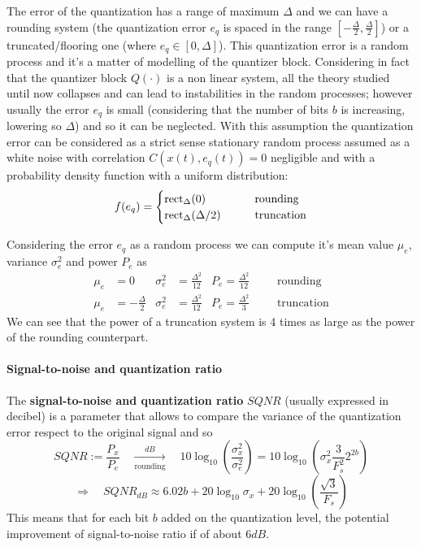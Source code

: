 	The error of the quantization has a range of maximum $\Delta$ and we can have a rounding system (the quantization error $e_q$ is spaced in the range $[-\frac \Delta 2, \frac \Delta 2]$) or a truncated/flooring one (where $e_q \in [0,\Delta]$). This quantization error is a random process and it's a matter of modelling of the quantizer block. Considering in fact that the quantizer block $Q(\cdot)$ is a non linear system, all the theory studied until now collapses and can lead to instabilities in the random processes; however usually the error $e_q$ is small (considering that the number of bits $b$ is increasing, lowering so $\Delta$) and so it can be neglected. With this assumption the quantization error can be considered as a strict sense stationary random process assumed as a white noise with correlation $C(x(t),e_q(t)) = 0$ negligible and with a probability density function with a uniform distribution:
	\[ f(e_q) = \begin{cases}
		\textrm{rect}_{\Delta}(0) \qquad &\textrm{rounding} \\
		\textrm{rect}_{\Delta}(\Delta/2) \qquad &\textrm{truncation} 
	\end{cases} \]
	
	Considering the error $e_q$ as a  random process we can compute it's mean value $\mu_e$, variance $\sigma_e^2$ and power $P_e$ as
	\begin{align*}
		\mu_e &= 0 &\sigma_e^2 &= \frac{\Delta^2}{12} & P_e =  \frac{\Delta^2}{12} &  &&\textrm{rounding} \\
		\mu_e &= -\frac{\Delta}{2} & \sigma_e^2 &= \frac{\Delta^2}{12} & P_e =  \frac{\Delta^2}{3} &  &&\textrm{truncation} 
	\end{align*}
	We can see that the power of a truncation system is 4 times as large as the power of the rounding counterpart.
	
	\paragraph{Signal-to-noise and quantization ratio} The \textbf{signal-to-noise and quantization ratio} $SQNR$ (usually expressed in decibel) is a parameter that allows to compare the variance of the quantization error respect to the original signal and so
	\[ SQNR := \frac{P_x}{P_e}  \quad \xrightarrow[\textrm{rounding}]{dB} \quad 10 \log_{10}\left(\frac{\sigma_x^2}{\sigma_e^2}\right) = 10 \log_{10}\left( \sigma_x^2 \frac{3}{F_s^2}2^{2b} \right)\]
	\[ \Rightarrow \quad SQNR_{dB} \approx 6.02b + 20 \log_{10} \sigma_x + 20 \log_{10}\left(\frac{\sqrt 3}{F_s} \right) \]
	This means that for each bit $b$ added on the quantization level, the potential improvement of signal-to-noise ratio if of about $6dB$.
		
		
		
		
		
		
		
		
		
		
		
		
		
		
		
		
		
		
		
		
		
		
		
		
		
		
		
		
		
		
		
		
	
	
	
	